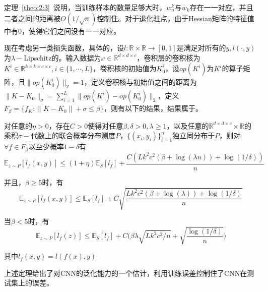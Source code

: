 \par
定理~\ref{theo:2:3}~说明，当训练样本的数量足够大时，$w_n^k$与$w_k$存在一一对应，并且二者之间的距离被$O(1/\sqrt{n})$控制住。对于退化驻点，由于Hessian矩阵的特征值中有0，使得它们之间没有一一对应。

\par
现在考虑另一类损失函数，具体的，设$l:\mathbb{R}\times \mathbb{R} \rightarrow [0,1]$是满足对所有的$y, l(\cdot,y)$为$\lambda-$Lipschitz的。输入数据为$x \in \mathbb{R}^{d\times d \times c}$，卷积层的卷积核为$K^i \in \mathbb{R}^{k\times k \times c\times c}, i\in\{1,\cdots,L\}$，卷积核的初始值为$K_0^i$，设$op(K^i)$为$K^i$的算子矩阵\cite{sedghi2018singular}，且$\|op(K^i_0)\|_2 = 1$，定义卷积核与初始值之间的距离为$\|K-K_0\|_\sigma = \sum_{i=1}^L\|op(K^i) - op(K_0^i)\|_2$，定义$F_\beta = \{f_K : \|K-K_0\|+\sigma \leq \beta\}$，则有以下的结果，结果属于\citet{long2019size}。

\begin{theorem}
对任意的$\eta > 0$，存在$C>0$使得对任意$\beta, \delta > 0, \lambda \geq 1$，以及任意的$\mathbb{R}^{d\times d \times c}\times \mathbb{R}$的乘积$\sigma-$代数上的联合概率分布测度$P$，$\{(x_i, y_i)\}_{i=1}^n$独立同分布于$P$，则对$\forall f\in F_\beta$以至少概率$1-\delta$有
\[
\mathbb{E}_{z\sim P}[l_f(x,y)] \leq (1+\eta)\mathbb{E}_S [l_f] + \frac{C(Lk^2c^2(\beta+\log(\lambda n)) + \log(1/\delta))}{n}
\]
\par
并且，$\beta \geq 5$时，有
\[
\mathbb{E}_{z\sim P}[l_f(x,y)] \leq \mathbb{E}_S[l_f]+C\sqrt{\frac{Lk^2c^2(\beta + \log(\lambda))+\log(1/\delta)}{n}}
\]
\par
当$\beta < 5$时，有
\[
\mathbb{E}_{z\sim P}[l_f(z)] \leq \mathbb{E}_S[l_f]+ C\big(\beta \lambda \sqrt{Lk^2c^2/n} + \sqrt{\frac{\log(1/\delta)}{n}}\big)
\]
\par
其中$l_f(x,y) = l(f(x),y)$
\end{theorem}

\par
上述定理给出了对CNN的泛化能力的一个估计，利用训练误差控制住了CNN在测试集上的误差。
